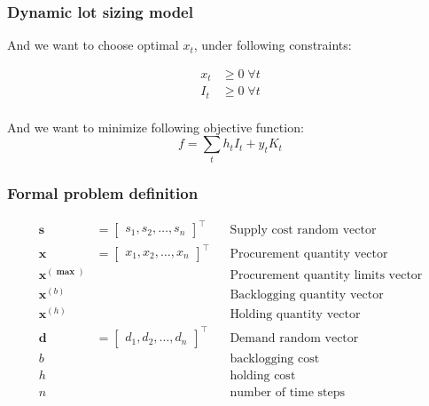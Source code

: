 \documentclass{beamer}
\begin{document}
\begin{frame}
    \frametitle{Dynamic lot sizing model}
    \begin{block}{}
        And we want to choose optimal $x_t$, under following constraints:

        \begin{align*}
          x_t &\ge 0 \; \forall t\\
          I_t &\ge 0 \; \forall t\\
        \end{align*}

        And we want to minimize following objective function:
        \begin{equation*}
          f = \sum_t{h_t I_t + y_t K_t}
        \end{equation*}
    \end{block}
\end{frame}

\begin{frame}
    \frametitle{Formal problem definition}
    \begin{align*}
        \mathbf{s} &= \begin{bmatrix}
            s_1, s_2, \dotsc, s_n
        \end{bmatrix}^\intercal && \text{Supply cost random vector} \\
        \mathbf{x} &= \begin{bmatrix}
            x_1, x_2, \dotsc, x_n
        \end{bmatrix}^\intercal && \text{Procurement quantity vector} \\
        \mathbf{x^{(\max)}}  & && \text{Procurement quantity limits vector} \\
        \mathbf{x}^{(b)}  & && \text{Backlogging quantity vector} \\
        \mathbf{x}^{(h)}  & && \text{Holding quantity vector} \\
        \mathbf{d} &= \begin{bmatrix}
            d_1, d_2, \dotsc, d_n
        \end{bmatrix}^\intercal && \text{Demand random vector} \\
        b & && \text{backlogging cost} \\
        h & && \text{holding cost} \\
        n & && \text{number of time steps}
    \end{align*}
\end{frame}
\end{document}
